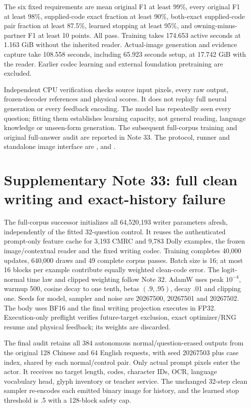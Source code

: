\documentclass[10pt,a4paper]{article}
\begin{document}
The six fixed requirements are mean original F1 at least 99\%, every
original F1 at least 98\%, supplied-code exact fraction at least 90\%,
both-exact supplied-code pair fraction at least 87.5\%, learned stopping at
least 95\%, and owning-minus-partner F1 at least 10 points. All pass.
Training takes 174.653 active seconds at 1.163 GiB without the inherited
reader. Actual-image generation and evidence capture take 108.558 seconds,
including 65.923 seconds setup, at 17.742 GiB with the reader. Earlier codec
learning and external foundation pretraining are excluded.

Independent CPU verification checks source input pixels, every raw output,
frozen-decoder references and physical scores. It does not replay full
neural generation or every feedback encoding. The model has repeatedly seen
every question; fitting them establishes learning capacity, not general
reading, language knowledge or unseen-form generation. The subsequent
full-corpus training and original full-answer audit are reported in Note 33.
The protocol, runner and standalone image interface are
,
 and
.

\section*{Supplementary Note 33: full clean writing and exact-history failure}
The full-corpus successor initializes all 64,520,193 writer parameters
afresh, independently of the fitted 32-question control. It reuses the
authenticated prompt-only feature cache for 3,193 CMRC and 9,783 Dolly
examples, the frozen image/contextual reader and the fixed writing codec.
Training completes 40,000 updates, 640,000 draws and 49 complete corpus
passes. Batch size is 16; at most 16 blocks per example contribute equally
weighted clean-code error. The logit-normal time law and clipped weighting
follow Note 32. AdamW uses peak $10^{-4}$, warmup 500, cosine decay to one
tenth, betas $(.9,.95)$, decay .01 and clipping one. Seeds for model, sampler
and noise are 20267500, 20267501 and 20267502. The body uses BF16 and the
final writing projection executes in FP32. Execution-only preflight verifies
future-target exclusion, exact optimizer/RNG resume and physical feedback;
its weights are discarded.

The final audit retains all 384 autonomous normal/question-erased outputs
from the original 128 Chinese and 64 English requests, with seed 20267503
plus case index, shared by each normal/control pair. Only actual prompt
pixels enter the actor. It receives no target length, codes, character IDs,
OCR, language vocabulary head, glyph inventory or teacher service. The
unchanged 32-step clean sampler re-encodes each emitted binary image for
history, and the learned stop threshold is .5 with a 128-block safety cap.
\end{document}
